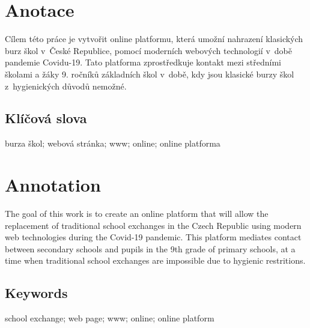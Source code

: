\documentclass{template/socthesis}
\author{Vít Falta}
\begin{document}
	
	\maketitle
	
	
	
	\pagestyle{empty}
	
	\section*{Anotace}
	Cílem této práce je vytvořit online platformu, která umožní nahrazení klasických burz škol v~České Republice, pomocí moderních webových technologií v~době pandemie Covidu-19. Tato platforma zprostředkuje kontakt mezi středními školami a žáky 9. ročníků základních škol v~době, kdy jsou klasické burzy škol z~hygienických důvodů nemožné.
	
	\subsection*{Klíčová slova}
	burza škol; webová stránka; www; online; online platforma
	
	\vspace{20mm}
	
	\section*{Annotation}
	The goal of this work is to create an online platform that will allow the replacement of traditional school exchanges in the Czech Republic using modern web technologies during the Covid-19 pandemic. This platform mediates contact between secondary schools and pupils in the 9th grade of primary schools, at a time when traditional school exchanges are impossible due to hygienic restritions.

	\subsection*{Keywords}
	school exchange; web page; www; online; online platform
	
\end{document}
